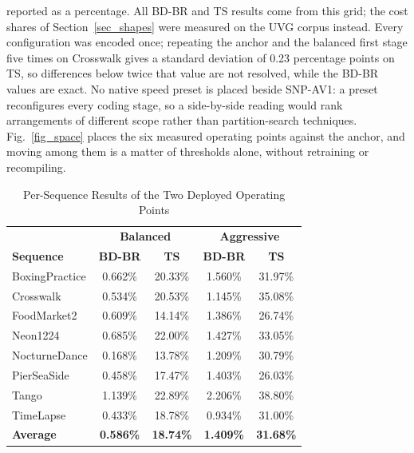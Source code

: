 \documentclass[conference]{IEEEtran}
\begin{document}
reported as a percentage. All BD-BR and TS results come from this grid; the cost
shares of Section~\ref{sec_shapes} were measured on the UVG corpus instead. Every
configuration was encoded once; repeating the anchor and the balanced first stage
five times on Crosswalk gives a standard deviation of 0.23 percentage points on
TS, so differences below twice that value are not resolved, while the BD-BR
values are exact. No native speed preset is placed beside SNP-AV1: a preset
reconfigures every coding stage, so a side-by-side reading would rank
arrangements of different scope rather than partition-search techniques.
Fig.~\ref{fig_space} places the six measured operating points against the anchor,
and moving among them is a matter of thresholds alone, without retraining or
recompiling.

\begin{table}[!t]
\renewcommand{\arraystretch}{1.05}
\caption{Per-Sequence Results of the Two Deployed Operating Points}
\label{tab_seq}
\centering
\begin{tabular}{lcccc}
\hline
 & \multicolumn{2}{c}{\textbf{Balanced}} & \multicolumn{2}{c}{\textbf{Aggressive}} \\
\textbf{Sequence} & \textbf{BD-BR} & \textbf{TS} & \textbf{BD-BR} & \textbf{TS} \\
\hline
BoxingPractice & 0.662\% & 20.33\% & 1.560\% & 31.97\% \\
Crosswalk & 0.534\% & 20.53\% & 1.145\% & 35.08\% \\
FoodMarket2 & 0.609\% & 14.14\% & 1.386\% & 26.74\% \\
Neon1224 & 0.685\% & 22.00\% & 1.427\% & 33.05\% \\
NocturneDance & 0.168\% & 13.78\% & 1.209\% & 30.79\% \\
PierSeaSide & 0.458\% & 17.47\% & 1.403\% & 26.03\% \\
Tango & 1.139\% & 22.89\% & 2.206\% & 38.80\% \\
TimeLapse & 0.433\% & 18.78\% & 0.934\% & 31.00\% \\
\hline
\textbf{Average} & \textbf{0.586\%} & \textbf{18.74\%} & \textbf{1.409\%} & \textbf{31.68\%} \\
\hline
\end{tabular}
\end{table}
\end{document}
